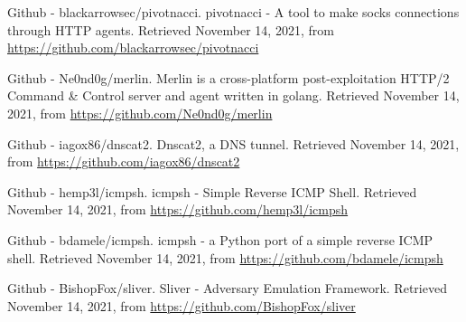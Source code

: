 \begin{thebibliography}{99}
Github - blackarrowsec/pivotnacci.
pivotnacci - A tool to make socks connections through HTTP agents.
Retrieved November 14, 2021, from \url{https://github.com/blackarrowsec/pivotnacci}

Github - Ne0nd0g/merlin.
Merlin is a cross-platform post-exploitation HTTP/2 Command \& Control server and agent written in golang.
Retrieved November 14, 2021, from \url{https://github.com/Ne0nd0g/merlin}


Github - iagox86/dnscat2.
Dnscat2, a DNS tunnel.
Retrieved November 14, 2021, from \url{https://github.com/iagox86/dnscat2}

Github - hemp3l/icmpsh.
icmpsh - Simple Reverse ICMP Shell.
Retrieved November 14, 2021, from \url{https://github.com/hemp3l/icmpsh}

Github - bdamele/icmpsh.
icmpsh - a Python port of a simple reverse ICMP shell.
Retrieved November 14, 2021, from \url{https://github.com/bdamele/icmpsh}

Github - BishopFox/sliver.
Sliver - Adversary Emulation Framework.
Retrieved November 14, 2021, from \url{https://github.com/BishopFox/sliver}





























\end{thebibliography}